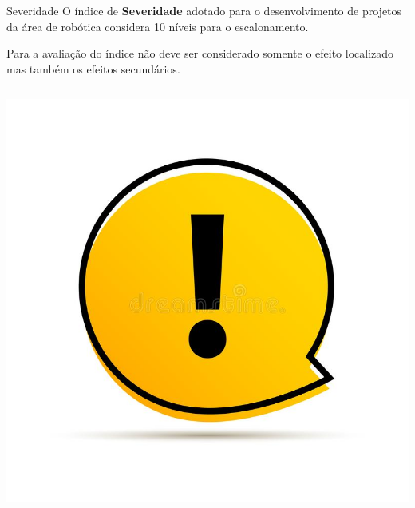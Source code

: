 \documentclass[aspectratio=169]{beamer}
\begin{document}
\begin{frame}[t]{Severidade}
    O índice de \textbf{Severidade} adotado para o desenvolvimento de projetos da área de robótica considera 10 níveis para o escalonamento.

    Para a avaliação do índice não deve ser considerado somente o efeito localizado mas também os efeitos secundários.
     \begin{columns}
             \includegraphics[width=1\textwidth, trim={0 0 0 0},clip]{alerta}
            \begin{table}[ht]
            \centering
\end{table}
\end{columns}
\end{frame}
\end{document}
